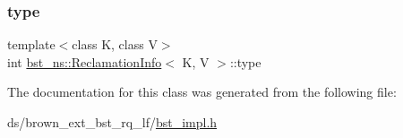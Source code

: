 \subsubsection{\texorpdfstring{type}{type}}
{\footnotesize\ttfamily template$<$class K, class V$>$ \\
int \hyperlink{classbst__ns_1_1ReclamationInfo}{bst\+\_\+ns\+::\+Reclamation\+Info}$<$ K, V $>$\+::type}



The documentation for this class was generated from the following file\+:\begin{DoxyCompactItemize}
\item 
ds/brown\+\_\+ext\+\_\+bst\+\_\+rq\+\_\+lf/\hyperlink{bst__impl_8h}{bst\+\_\+impl.\+h}\end{DoxyCompactItemize}

